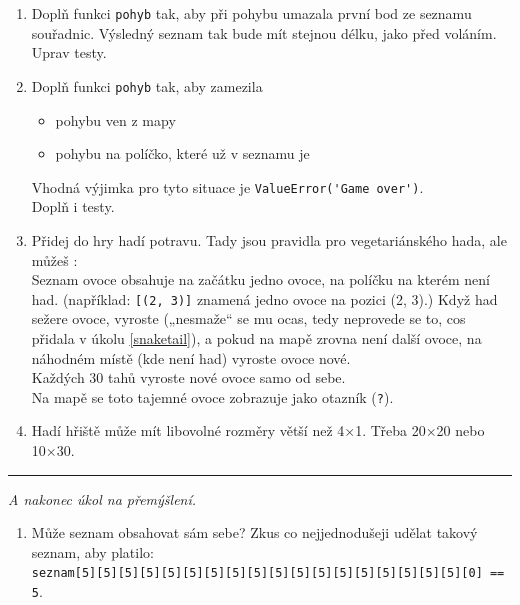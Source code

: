 \documentclass[a4paper,10pt]{article}
\newcommand\startsection[1]{
     \vspace{0.2ex}
    \hrule
    {\fontspec{Oxygen} \tiny
     \vspace{-1ex}
     \emph{#1}
     \vspace{-1.5em}
    }
}
\begin{document}
\begin{enumerate}[resume]
\item \label{snaketail}
    Doplň funkci \verb+pohyb+ tak, aby při pohybu umazala první bod ze seznamu
    souřadnic. Výsledný seznam tak bude mít stejnou délku, jako před voláním.
    \\Uprav testy.

\item Doplň funkci \verb+pohyb+ tak, aby zamezila
    \begin{itemize}
    \item pohybu ven z mapy
    \item pohybu na políčko, které už v seznamu je
    \end{itemize}
    Vhodná výjimka pro tyto situace je \verb+ValueError('Game over')+.
    \\Doplň i testy.

\item Přidej do hry hadí potravu. Tady jsou pravidla pro vegetariánského hada,
    ale můžeš :
    \\ Seznam ovoce obsahuje na začátku jedno ovoce, na políčku na kterém není had.
    (například: \texttt{[(2, 3)]} znamená jedno ovoce na pozici (2, 3).)
    Když had sežere ovoce, vyroste („nesmaže“ se mu ocas, tedy neprovede se to,
    cos přidala v úkolu \ref{snaketail}),
    a pokud na mapě zrovna není další ovoce, na náhodném místě (kde není had) vyroste ovoce nové.
    \\Každých 30 tahů vyroste nové ovoce samo od sebe.
    \\Na mapě se toto tajemné ovoce zobrazuje jako otazník (\verb+?+).

\item \label{snakeend}
    Hadí hřiště může mít libovolné rozměry větší než 4×1.
    Třeba 20×20 nebo 10×30.

\end{enumerate}

\startsection{A nakonec úkol na přemýšlení.}

\begin{enumerate}[resume]

\item Může seznam obsahovat sám sebe? Zkus co nejjednodušeji udělat takový seznam, aby platilo:
    \\\verb+seznam[5][5][5][5][5][5][5][5][5][5][5][5][5][5][5][5][5][5][0] == 5+.

\end{enumerate}
\end{document}
